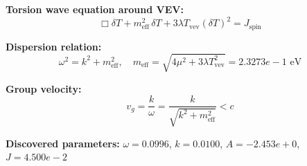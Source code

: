 
\textbf{Torsion wave equation around VEV:}
\begin{equation}
  \Box \delta T + m_{\text{eff}}^2 \, \delta T + 3\lambda T_{\text{vev}} (\delta T)^2 = J_{\text{spin}}
\end{equation}

\textbf{Dispersion relation:}
\begin{equation}
  \omega^2 = k^2 + m_{\text{eff}}^2, \quad
  m_{\text{eff}} = \sqrt{4\mu^2 + 3\lambda T_{\text{vev}}^2} = 2.3273e-1 \text{ eV}
\end{equation}

\textbf{Group velocity:}
\begin{equation}
  v_g = \frac{k}{\omega} = \frac{k}{\sqrt{k^2 + m_{\text{eff}}^2}} < c
\end{equation}

\textbf{Discovered parameters:}
$\omega = 0.0996$, \quad
$k = 0.0100$, \quad
$A = -2.453e+0$, \quad
$J = 4.500e-2$